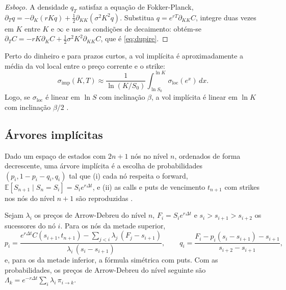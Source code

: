 \begin{proof}[Esboço]
A densidade $q_T$ satisfaz a equação de Fokker-Planck, $\partial_Tq=-\partial_K(rKq)+\tfrac12\partial_{KK}(\sigma^2K^2q)$. Substitua $q=e^{rT}\partial_{KK}C$, integre duas vezes em $K$ entre $K$ e $\infty$ e use as condições de decaimento: obtém-se $\partial_TC=-rK\partial_KC+\tfrac12\sigma^2K^2\partial_{KK}C$, que é \eqref{eq:dupire}.
\end{proof}

\begin{proposicao}
Perto do dinheiro e para prazos curtos, a vol implícita é aproximadamente a média da vol local entre o preço corrente e o strike:
\begin{equation}
\sigma_{\mathrm{imp}}(K,T)\approx\frac{1}{\ln(K/S_0)}\int_{\ln S_0}^{\ln K}\sigma_{\mathrm{loc}}(e^x)\,dx.
\end{equation}
Logo, se $\sigma_{\mathrm{loc}}$ é linear em $\ln S$ com inclinação $\beta$, a vol implícita é linear em $\ln K$ com inclinação $\beta/2$ \citep{dkz1996,gatheral2006}.
\end{proposicao}

\subsection{Árvores implícitas}

\begin{definicao}
Dado um espaço de estados com $2n+1$ nós no nível $n$, ordenados de forma decrescente, uma árvore implícita é a escolha de probabilidades $(p_i,1-p_i-q_i,q_i)$ tal que (i) cada nó respeita o forward, $\mathbb E[S_{n+1}\mid S_n=S_i]=S_ie^{r\Delta t}$, e (ii) as calls e puts de vencimento $t_{n+1}$ com strikes nos nós do nível $n+1$ são reproduzidas \citep{dermankani1994,dkc1996}.
\end{definicao}

\begin{proposicao}
Sejam $\lambda_i$ os preços de Arrow-Debreu do nível $n$, $F_i=S_ie^{r\Delta t}$ e $s_i>s_{i+1}>s_{i+2}$ os sucessores do nó $i$. Para os nós da metade superior,
\begin{equation}
p_i=\frac{e^{r\Delta t}C(s_{i+1},t_{n+1})-\sum_{j<i}\lambda_j\,(F_j-s_{i+1})}{\lambda_i\,(s_i-s_{i+1})},\qquad q_i=\frac{F_i-p_i(s_i-s_{i+1})-s_{i+1}}{s_{i+2}-s_{i+1}},
\end{equation}
e, para os da metade inferior, a fórmula simétrica com puts. Com as probabilidades, os preços de Arrow-Debreu do nível seguinte são $\Lambda_k=e^{-r\Delta t}\sum_i\lambda_i\,\pi_{i\to k}$.
\end{proposicao}

